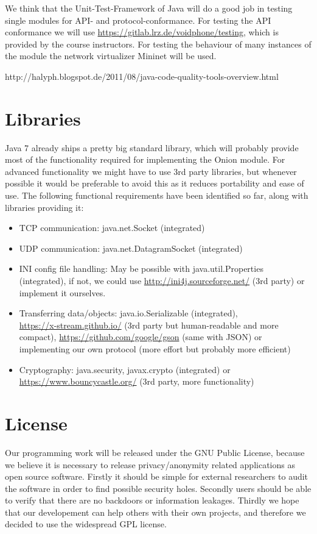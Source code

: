 \documentclass{article}
\begin{document}
We think that the Unit-Test-Framework of Java will do a good job in testing
single modules for API- and protocol-conformance. For testing the API
conformance we will use \url{https://gitlab.lrz.de/voidphone/testing}, which is
provided by the course instructors. For testing the behaviour of many instances
of the module the network virtualizer Mininet will be used.

http://halyph.blogspot.de/2011/08/java-code-quality-tools-overview.html

\section{Libraries}
Java 7 already ships a pretty big standard library, which will probably provide most of the functionality required for implementing the Onion module. For advanced functionality we might have to use 3rd party libraries, but whenever possible it would be preferable to avoid this as it reduces portability and ease of use. 
The following functional requirements have been identified so far, along with libraries providing it:
\begin{itemize}
\item TCP communication: java.net.Socket (integrated)
\item UDP communication: java.net.DatagramSocket (integrated)
\item INI config file handling: May be possible with java.util.Properties (integrated), if not, we could use \url{http://ini4j.sourceforge.net/} (3rd party) or implement it ourselves.
\item Transferring data/objects: java.io.Serializable (integrated), \\ \url{https://x-stream.github.io/} (3rd party but human-readable and more compact), \url{https://github.com/google/gson} (same with JSON) or implementing our own protocol (more effort but probably more efficient)
\item Cryptography: java.security, javax.crypto (integrated) or \\ \url{https://www.bouncycastle.org/} (3rd party, more functionality)
\end{itemize}



\section{License}
Our programming work will be released under the GNU Public License, because we
believe it is necessary to release privacy/anonymity related applications as
open source software. Firstly it should be simple for external researchers to
audit the software in order to find possible security holes. Secondly users
should be able to verify that there are no backdoors or information leakages.
Thirdly we hope that our developement can help others with their own projects,
and therefore we decided to use the widespread GPL license.
\end{document}
